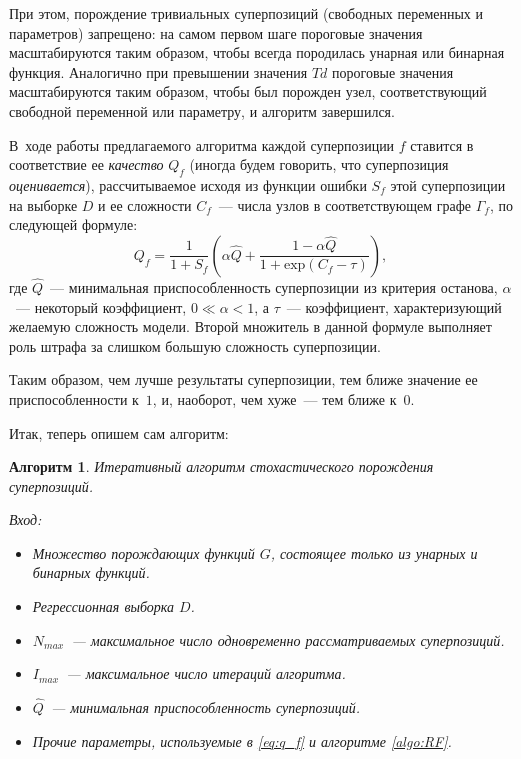 \documentclass[12pt,a4paper]{article}
\newtheorem{algo}{Алгоритм}
\begin{document}
При этом, порождение тривиальных суперпозиций (свободных переменных и
параметров) запрещено: на самом первом шаге пороговые значения масштабируются
таким образом, чтобы всегда породилась унарная или бинарная функция.
Аналогично при превышении значения $Td$ пороговые значения масштабируются
таким образом, чтобы был порожден узел, соответствующий свободной переменной
или параметру, и алгоритм завершился.

В~ходе работы предлагаемого алгоритма каждой суперпозиции $f$ ставится в
соответствие ее \emph{качество} $Q_f$ (иногда будем говорить, что
суперпозиция \emph{оценивается}), рассчитываемое исходя из функции ошибки
$S_f$ этой суперпозиции на выборке $D$ и ее сложности $C_f$~---
числа узлов в соответствующем графе $\Gamma_f$, по следующей формуле:
\begin{equation}
  \label{eq:q_f}
  Q_f = \frac{1}{1 + S_f} \left(\alpha \hat{Q} + \frac{1 - \alpha \hat{Q}}{1 + \text{exp} (C_f - \tau)}\right),
\end{equation}
где $\hat{Q}$~--- минимальная приспособленность суперпозиции из критерия
останова, $\alpha$~--- некоторый коэффициент, $0 \ll \alpha < 1$, а
$\tau$~--- коэффициент, характеризующий желаемую сложность модели.
Второй множитель в данной формуле выполняет роль штрафа за слишком
большую сложность суперпозиции.

Таким образом, чем лучше результаты суперпозиции, тем ближе значение ее
приспособленности к~$1$, и, наоборот, чем хуже~--- тем ближе к~$0$.

Итак, теперь опишем сам алгоритм:
\begin{algo}
  \label{algo:SA}
  Итеративный алгоритм стохастического порождения суперпозиций.

  Вход:
  \begin{itemize}
	\item Множество порождающих функций $G$, состоящее только из унарных
	  и бинарных функций.
	\item Регрессионная выборка $D$.
	\item $N_{max}$~--- максимальное число одновременно рассматриваемых
	  суперпозиций.
	\item $I_{max}$~--- максимальное число итераций алгоритма.
	\item $\hat{Q}$~--- минимальная приспособленность суперпозиций.
	\item Прочие параметры, используемые в \eqref{eq:q_f} и алгоритме
	  \ref{algo:RF}.
  \end{itemize}
\end{algo}
\end{document}
